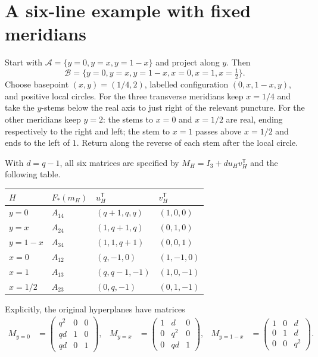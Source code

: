 \documentclass[11pt,a4paper]{article}
\theoremstyle{remark}\newtheorem{remark}[theorem]{Remark}
\newcommand{\A}{\mathcal A}
\newcommand{\B}{\mathcal B}
\begin{document}
\section{A six-line example with fixed meridians}\label{sec:six-lines}
Start with $\A=\{y=0,y=x,y=1-x\}$ and project along $y$.
Then
\[
\B=\{y=0,y=x,y=1-x,x=0,x=1,x=\tfrac12\}.
\]
Choose basepoint $(x,y)=(1/4,2)$, labelled configuration
$(0,x,1-x,y)$, and positive local circles.  For the three transverse
meridians keep $x=1/4$ and take the $y$-stems below the real axis to just
right of the relevant puncture.  For the other meridians keep $y=2$:
the stems to $x=0$ and $x=1/2$ are real, ending respectively to the right
and left; the stem to $x=1$ passes above $x=1/2$ and ends to the left of
$1$.  Return along the reverse of each stem after the local circle.

With $d=q-1$, all six matrices are specified by
$M_H=I_3+d u_Hv_H^{\mathsf T}$ and the following table.
\begin{center}
\renewcommand{\arraystretch}{1.2}
\begin{tabular}{llll}
\toprule
$H$ & $F_*(m_H)$ & $u_H^{\mathsf T}$ & $v_H^{\mathsf T}$\\
\midrule
$y=0$ & $A_{14}$ & $(q+1,q,q)$ & $(1,0,0)$\\
$y=x$ & $A_{24}$ & $(1,q+1,q)$ & $(0,1,0)$\\
$y=1-x$ & $A_{34}$ & $(1,1,q+1)$ & $(0,0,1)$\\
$x=0$ & $A_{12}$ & $(q,-1,0)$ & $(1,-1,0)$\\
$x=1$ & $A_{13}$ & $(q,q-1,-1)$ & $(1,0,-1)$\\
$x=1/2$ & $A_{23}$ & $(0,q,-1)$ & $(0,1,-1)$\\
\bottomrule
\end{tabular}
\end{center}
Explicitly, the original hyperplanes have matrices
\begin{align*}
M_{y=0}&=\begin{pmatrix}q^2&0&0\\qd&1&0\\qd&0&1\end{pmatrix},&
M_{y=x}&=\begin{pmatrix}1&d&0\\0&q^2&0\\0&qd&1\end{pmatrix},&
M_{y=1-x}&=\begin{pmatrix}1&0&d\\0&1&d\\0&0&q^2\end{pmatrix}.
\end{align*}
\end{document}
